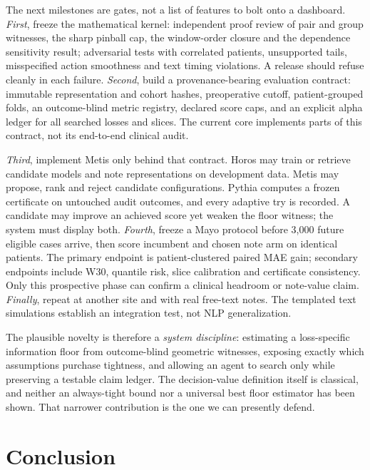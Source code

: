 \documentclass[11pt,a4paper]{article}
\begin{document}
The next milestones are gates, not a list of features to bolt onto a dashboard. \emph{First}, freeze the mathematical kernel: independent proof review of pair and group witnesses, the sharp pinball cap, the window-order closure and the dependence sensitivity result; adversarial tests with correlated patients, unsupported tails, misspecified action smoothness and text timing violations. A release should refuse cleanly in each failure. \emph{Second}, build a provenance-bearing evaluation contract: immutable representation and cohort hashes, preoperative cutoff, patient-grouped folds, an outcome-blind metric registry, declared score caps, and an explicit alpha ledger for all searched losses and slices. The current core implements parts of this contract, not its end-to-end clinical audit.

\emph{Third}, implement Metis only behind that contract. Horos may train or retrieve candidate models and note representations on development data. Metis may propose, rank and reject candidate configurations. Pythia computes a frozen certificate on untouched audit outcomes, and every adaptive try is recorded. A candidate may improve an achieved score yet weaken the floor witness; the system must display both. \emph{Fourth}, freeze a Mayo protocol before 3,000 future eligible cases arrive, then score incumbent and chosen note arm on identical patients. The primary endpoint is patient-clustered paired MAE gain; secondary endpoints include W30, quantile risk, slice calibration and certificate consistency. Only this prospective phase can confirm a clinical headroom or note-value claim. \emph{Finally}, repeat at another site and with real free-text notes. The templated text simulations establish an integration test, not NLP generalization.

\newpage
The plausible novelty is therefore a \emph{system discipline}: estimating a loss-specific information floor from outcome-blind geometric witnesses, exposing exactly which assumptions purchase tightness, and allowing an agent to search only while preserving a testable claim ledger. The decision-value definition itself is classical, and neither an always-tight bound nor a universal best floor estimator has been shown. That narrower contribution is the one we can presently defend.

\section{Conclusion}
\end{document}
